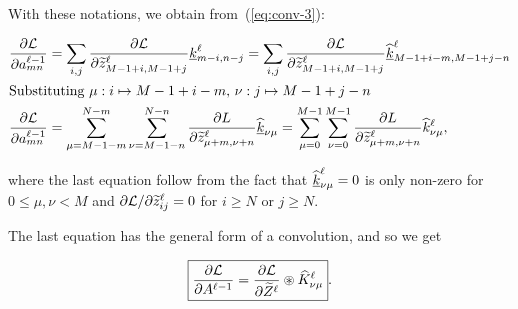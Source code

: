 \documentclass[a4paper,10pt]{article}
\def\Loss{\mathcal{L}}
\begin{document}
With these notations, we obtain from~(\ref{eq:conv-3}):

\begin{align*}
    \frac{\partial \Loss}{\partial a_{mn}^{\ell-1}} &= 
    \sum_{i,j}
    \frac{\partial \Loss}{\partial \pad z_{M-1+i,M-1+j}^\ell} \ov{k}_{m-i, n-j}^\ell 
    = \sum_{i,j}
    \frac{\partial \Loss}{\partial \pad z_{M-1+i, M-1+j}^\ell}
    \ov{\flip k}^\ell_{M-1+i-m, M-1+j-n} \\
    \intertext{Substituting $\mu:  i\mapsto M-1+i-m$, $\nu: j \mapsto M-1+j-n$} 
    \frac{\partial \Loss}{\partial a_{mn}^{\ell-1}}
    &= \sum_{\mu = M-1-m}^{N-m} \sum_{\nu = M-1-n}^{N-n} 
    \frac{\partial L}{\partial \pad z_{\mu + m, \nu + n} ^\ell} \ov{\flip k}_{\nu \mu} = 
    \sum_{\mu = 0}^{M-1}\sum_{\nu = 0}^{M-1} 
    \frac{\partial L}{\partial \pad z_{\mu + m, \nu + n}^\ell} \flip k_{\nu \mu}^\ell,
\end{align*}

where the last equation follow from the fact that
$\underline{\widehat{k}}^\ell_{\nu \mu} = 0$ is only non-zero for $0\le \mu, \nu < M$ and
$\partial \Loss / \partial \pad z^\ell_{ij} =0$ for $i \ge N$ or $j \ge N$.

The last equation has the general form of a convolution, and so we get

\begin{equation}
    \boxed{
        \frac{\partial \Loss}{\partial A^{\ell-1}} = \frac{\partial \Loss}{\partial \pad Z^\ell} 
        \circledast \flip K_{\nu \mu}^\ell }.
\end{equation}
\end{document}
